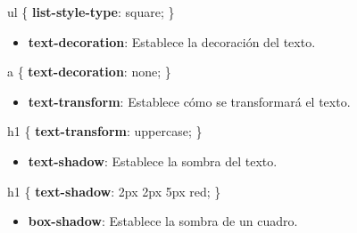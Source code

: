 \documentclass[
  a4paper,
  DIV=11,
  numbers=noendperiod,
  onepage,
  openany]{scrreprt}
\newenvironment{Shaded}{\begin{snugshade}}{\end{snugshade}}
\newcommand{\CharTok}[1]{\textcolor[rgb]{0.13,0.47,0.30}{#1}}
\newcommand{\ConstantTok}[1]{\textcolor[rgb]{0.56,0.35,0.01}{#1}}
\newcommand{\DataTypeTok}[1]{\textcolor[rgb]{0.68,0.00,0.00}{#1}}
\newcommand{\DecValTok}[1]{\textcolor[rgb]{0.68,0.00,0.00}{#1}}
\newcommand{\KeywordTok}[1]{\textcolor[rgb]{0.00,0.23,0.31}{\textbf{#1}}}
\newcommand{\NormalTok}[1]{\textcolor[rgb]{0.00,0.23,0.31}{#1}}
\newcommand{\OperatorTok}[1]{\textcolor[rgb]{0.37,0.37,0.37}{#1}}
\providecommand{\tightlist}{%
  \setlength{\itemsep}{0pt}\setlength{\parskip}{0pt}}\usepackage{longtable,booktabs,array}
\begin{document}
\begin{tcolorbox}
\begin{Shaded}
\begin{Highlighting}[]
\NormalTok{ul \{}
  \KeywordTok{list{-}style{-}type}\CharTok{:} \DecValTok{square}\OperatorTok{;}
\NormalTok{\}}
\end{Highlighting}
\end{Shaded}

\begin{itemize}
\tightlist
\item
  \textbf{text-decoration}: Establece la decoración del texto.
\end{itemize}

\begin{Shaded}
\begin{Highlighting}[]
\NormalTok{a \{}
  \KeywordTok{text{-}decoration}\CharTok{:} \DecValTok{none}\OperatorTok{;}
\NormalTok{\}}
\end{Highlighting}
\end{Shaded}

\begin{itemize}
\tightlist
\item
  \textbf{text-transform}: Establece cómo se transformará el texto.
\end{itemize}

\begin{Shaded}
\begin{Highlighting}[]
\NormalTok{h1 \{}
  \KeywordTok{text{-}transform}\CharTok{:} \DecValTok{uppercase}\OperatorTok{;}
\NormalTok{\}}
\end{Highlighting}
\end{Shaded}

\begin{itemize}
\tightlist
\item
  \textbf{text-shadow}: Establece la sombra del texto.
\end{itemize}

\begin{Shaded}
\begin{Highlighting}[]
\NormalTok{h1 \{}
  \KeywordTok{text{-}shadow}\CharTok{:} \DecValTok{2}\DataTypeTok{px} \DecValTok{2}\DataTypeTok{px} \DecValTok{5}\DataTypeTok{px} \ConstantTok{red}\OperatorTok{;}
\NormalTok{\}}
\end{Highlighting}
\end{Shaded}

\begin{itemize}
\tightlist
\item
  \textbf{box-shadow}: Establece la sombra de un cuadro.
\end{itemize}


\end{tcolorbox}
\end{document}
